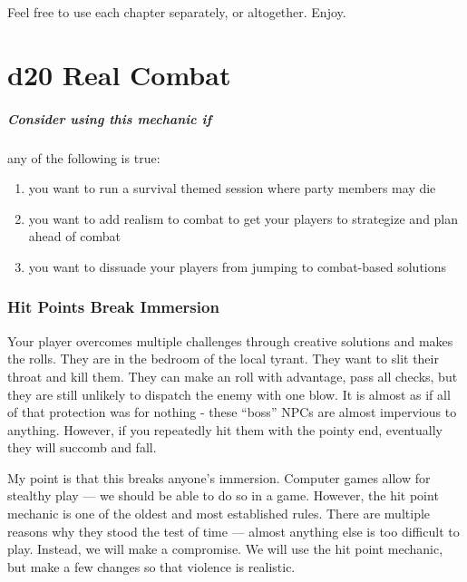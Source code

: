 \documentclass[twocolumn]{dndbook}
\begin{document}
Feel free to use each chapter separately, or altogether. Enjoy.




\chapter{d20 Real Combat}
\label{chap:d20_real_combat}

\begin{emphasisParagraph}
	\paragraph*{Consider using this mechanic if} any of the following is true:
	\begin{enumerate}
		\item you want to run a survival themed session where party members may die
		\item you want to add realism to combat to get your players to strategize and plan ahead of combat
		\item you want to dissuade your players from jumping to combat-based solutions
	\end{enumerate}
\end{emphasisParagraph}


\subsection{Hit Points Break Immersion}

Your player overcomes multiple challenges through creative solutions and makes the rolls.
They are in the bedroom of the local tyrant. They want to slit their throat and kill them.
They can make an roll with advantage, pass all checks, but they are still unlikely to dispatch the enemy with one blow.
It is almost as if all of that protection was for nothing - these ``boss'' NPCs are almost impervious to anything.
However, if you repeatedly hit them with the pointy end, eventually they will succomb and fall.\par

My point is that this breaks anyone's immersion.
Computer games allow for stealthy play --- we should be able to do so in a game.
However, the hit point mechanic is one of the oldest and most established rules.
There are multiple reasons why they stood the test of time --- almost anything else is too difficult to play.
Instead, we will make a compromise.
We will use the hit point mechanic, but make a few changes so that violence is realistic.
\end{document}
